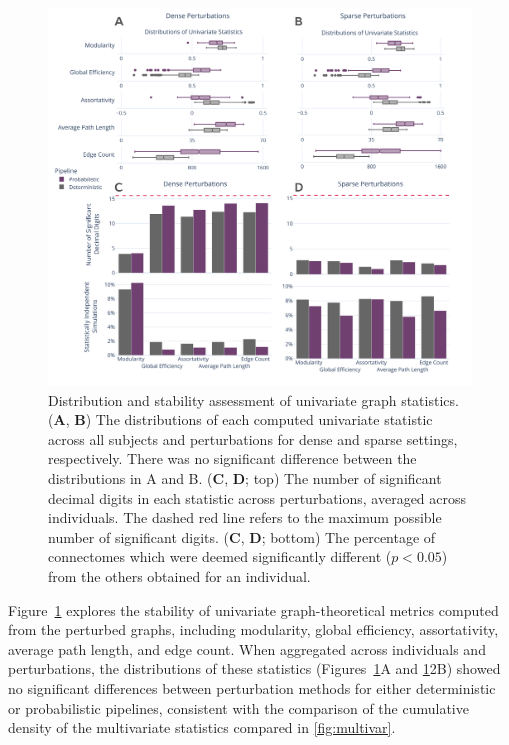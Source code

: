\documentclass[fleqn,10pt]{SelfArx} %
\newcommand{\new}[1]{{#1}}
\begin{document}
\begin{figure}[ht]\centering
\includegraphics[width=\linewidth]{figures/figS2_univariate_differences.pdf}
\caption{Distribution and stability assessment of univariate graph statistics. (\textbf{A}, \textbf{B}) The
distributions of each computed univariate statistic across all subjects and perturbations for \new{dense} and \new{sparse}
settings, respectively. There was no significant difference between the distributions in A and B. (\textbf{C},
\textbf{D}; top) The number of significant decimal digits in each statistic across perturbations, averaged across
individuals. The dashed red line refers to the maximum possible number of significant digits.
(\textbf{C}, \textbf{D}; bottom) The percentage of connectomes which were deemed significantly different
($p < 0.05$) from the others obtained for an individual.}
\label{sfig:univariate}
\end{figure}

Figure~\ref{sfig:univariate} explores the stability of univariate graph-theoretical metrics computed from the perturbed
graphs, including modularity, global efficiency, assortativity, average path length, and edge count. When aggregated
across individuals and perturbations, the distributions of these statistics (Figures~\ref{sfig:univariate}A and
\ref{sfig:univariate}2B) showed no significant differences between perturbation methods for either deterministic or
probabilistic pipelines\new{, consistent with the comparison of the cumulative density of the multivariate statistics
compared in \ref{fig:multivar}}.
\end{document}
